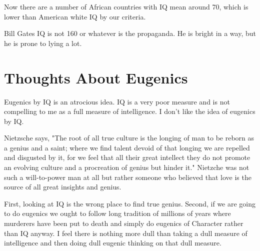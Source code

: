 \documentclass{amsart}
\begin{document}
Now there are a number of African countries with IQ mean around 70, which is lower than American white IQ by our criteria.  

Bill Gates IQ is not 160 or whatever is the propaganda.  He is bright in a way, but he is prone to lying a lot.

\section{Thoughts About Eugenics}

Eugenics by IQ is an atrocious idea.  IQ is a very poor measure and is not compelling to me as a full measure of intelligence.  I don't like the idea of eugenics by IQ.

Nietzsche says, "The root of all true culture is the longing of man to be reborn as a genius and a saint; where we find talent devoid of that longing we are repelled and disgusted by it, for we feel that all their great intellect they do not promote an evolving culture and a procreation of genius but hinder it."  Nietzche was not such a will-to-power man at all but rather someone who believed that love is the source of all great insights and genius.

First, looking at IQ is the wrong place to find true genius.  Second, if we are going to do eugenics we ought to follow long tradition of millions of years where murderers have been put to death and simply do eugenics of Character rather than IQ anyway.  I feel there is nothing more dull than taking a dull measure of intelligence and then doing dull eugenic thinking on that dull measure.
\end{document}
